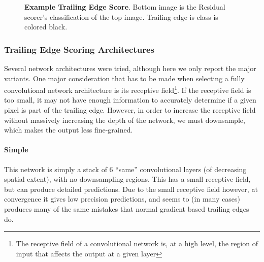 \begin{figure}[t]%
\centering
{}
\newline
{}
\caption{\textbf{Example Trailing Edge Score}. Bottom image is the Residual scorer's classification of the top image. Trailing edge is class is colored black.}
\label{fig:example_te_score_annotres}
\end{figure}



\subsubsection{Trailing Edge Scoring Architectures} 
\label{sec:te_arch}

Several network architectures were tried, although here we only report the major variants.
One major consideration that has to be made when selecting a fully convolutional network architecture is its receptive field\footnote{The receptive field of a convolutional network is, at a high level, the region of input that affects the output at a given layer}.
If the receptive field is too small, it may not have enough information to accurately determine if a given pixel is part of the trailing edge.
However, in order to increase the receptive field without massively increasing the depth of the network, we must downsample, which makes the output less fine-grained.

\paragraph{Simple}
This network is simply a stack of $6$ ``same'' convolutional layers (of decreasing spatial extent), with no downsampling regions.
This has a small receptive field, but can produce detailed predictions.
Due to the small receptive field however, at convergence it gives low precision predictions, and seems to (in many cases) produces many of the same mistakes that normal gradient based trailing edges do.

